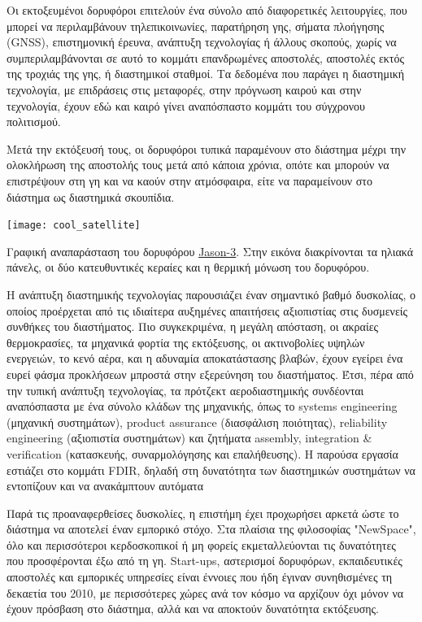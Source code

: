 \documentclass[a4paper,nobib]{tufte-book}
\begin{document}
Οι εκτοξευμένοι δορυφόροι επιτελούν ένα σύνολο από διαφορετικές λειτουργίες, που μπορεί να περιλαμβάνουν τηλεπικοινωνίες, παρατήρηση γης, σήματα πλοήγησης (\acs{GNSS}), επιστημονική έρευνα, ανάπτυξη τεχνολογίας ή άλλους σκοπούς, χωρίς να συμπεριλαμβάνονται σε αυτό το κομμάτι επανδρωμένες αποστολές, αποστολές εκτός της τροχιάς της γης, ή διαστημικοί σταθμοί. Τα δεδομένα που παράγει η διαστημική τεχνολογία, με επιδράσεις στις μεταφορές, στην πρόγνωση καιρού και στην τεχνολογία, έχουν εδώ και καιρό γίνει αναπόσπαστο κομμάτι του σύγχρονου πολιτισμού.

Μετά την εκτόξευσή τους, οι δορυφόροι τυπικά παραμένουν στο διάστημα μέχρι την ολοκλήρωση της αποστολής τους μετά από κάποια χρόνια, οπότε και μπορούν να επιστρέψουν στη γη και να καούν στην ατμόσφαιρα, είτε να παραμείνουν στο διάστημα ως διαστημικά σκουπίδια.

\begin{marginfigure}
	\texttt{[image: cool\_satellite]}
	\caption[Γραφική αναπαράσταση του δορυφόρου Jason-3]{Γραφική αναπαράσταση του δορυφόρου \href{https://www.flickr.com/photos/noaasatellites/16979948568}{Jason-3}. Στην εικόνα διακρίνονται τα ηλιακά πάνελς, οι δύο κατευθυντικές κεραίες και η θερμική μόνωση του δορυφόρου.}
\end{marginfigure}

Η ανάπτυξη διαστημικής τεχνολογίας παρουσιάζει έναν σημαντικό βαθμό δυσκολίας, ο οποίος προέρχεται από τις ιδιαίτερα αυξημένες απαιτήσεις αξιοπιστίας στις δυσμενείς συνθήκες του διαστήματος. Πιο συγκεκριμένα, η μεγάλη απόσταση, οι ακραίες θερμοκρασίες, τα μηχανικά φορτία της εκτόξευσης, οι ακτινοβολίες υψηλών ενεργειών, το κενό αέρα,  και η αδυναμία αποκατάστασης βλαβών, έχουν εγείρει ένα ευρεί φάσμα προκλήσεων μπροστά στην εξερεύνηση του διαστήματος. Έτσι, πέρα από την τυπική ανάπτυξη τεχνολογίας, τα πρότζεκτ αεροδιαστημικής συνδέονται αναπόσπαστα με ένα σύνολο κλάδων της μηχανικής, όπως το systems engineering (μηχανική συστημάτων), product assurance (διασφάλιση ποιότητας), reliability engineering (αξιοπιστία συστημάτων) και ζητήματα assembly, integration \& verification (κατασκευής, συναρμολόγησης και επαλήθευσης). \autocite{smad} Η παρούσα εργασία εστιάζει στο κομμάτι \acf{FDIR}, δηλαδή στη δυνατότητα των διαστημικών συστημάτων να εντοπίζουν και να ανακάμπτουν αυτόματα 

Παρά τις προαναφερθείσες δυσκολίες, η επιστήμη έχει προχωρήσει αρκετά ώστε το διάστημα να αποτελεί έναν εμπορικό στόχο. Στα πλαίσια της φιλοσοφίας "NewSpace", όλο και περισσότεροι κερδοσκοπικοί ή μη φορείς εκμεταλλεύονται τις δυνατότητες που προσφέρονται έξω από τη γη. \autocite{denis_new_space_2020} Start-ups, αστερισμοί δορυφόρων, εκπαιδευτικές αποστολές και εμπορικές υπηρεσίες είναι έννοιες που ήδη έγιναν συνηθισμένες τη δεκαετία του 2010, με περισσότερες χώρες ανά τον κόσμο να αρχίζουν όχι μόνον να έχουν πρόσβαση στο διάστημα, αλλά και να αποκτούν δυνατότητα εκτόξευσης.
\end{document}
